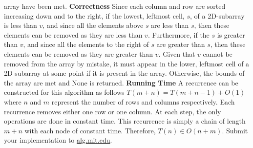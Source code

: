 \documentclass[12pt,twoside]{article}
\begin{document}
\begin{problems}
\begin{problemparts}
    array have been met.
    \smallbreak
    \textbf{Correctness} Since each column and row are sorted increasing down
    and to the right, if the lowest, leftmost cell, $ s $, of a 2D-subarray is
    less than $ v $, and since all the elements above $ s $ are less than $ s $,
    then these elements can be removed as they are less than $ v $. Furthermore,
    if the $ s $ is greater than $ v $, and since all the elements to the right
    of $ s $ are greater than $ s $, then these elements can be removed as they
    are greater than $ v $. Given that $ v $ cannot be removed from the array by
    mistake, it must appear in the lower, leftmost cell of a 2D-subarray at some
    point if it is present in the array. Otherwise, the bounds of the array are
    met and None is returned.
    \smallbreak
    \textbf{Running Time} A recurrence can be constructed for this algorithm as
    follows $ T(m + n) = T(m + n - 1) + O(1) $ where $ n $ and $ m $ represent
    the number of rows and columns respectively. Each recurrence removes either
    one row or one column. At each step, the only operations are done in
    constant time. This recurrence is simply a chain of length $ m + n $ with
    each node of constant time. Therefore, $ T(n) \in O(n + m) $.
\problempart Submit your implementation to {\small\url{alg.mit.edu}}.
\end{problemparts}

\end{problems}
\end{document}
